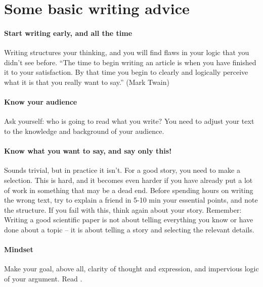 \documentclass{tufte-book}
\begin{document}
\section{Some basic writing advice}

\paragraph{Start writing early, and all the time} Writing structures your thinking, and you will find flaws in your logic that you didn't see before. ``The time to begin writing an article is when you have finished it to your satisfaction. By that time you begin to clearly and logically perceive what it is that you really want to say.'' (Mark Twain)


\paragraph{Know your audience} Ask yourself: who is going to read what you write?  You need to adjust your text to the knowledge and background of your audience. 


\paragraph{Know what you want to say, and say only this!} Sounds trivial, but in practice it isn't. For a good story, you need to make a selection. This is hard, and it becomes even harder if you have already put a lot of work in something that may be a dead end. Before spending hours on writing the wrong text, try to explain a friend in 5-10 min your essential points, and note the structure. If you fail with this, think again about your story. Remember: Writing a good scientific paper is not about telling everything you know or have done about a topic -- it is about telling a story and selecting the relevant details. 

\paragraph{Mindset} Make your goal, above all, clarity of thought and expression, and impervious logic of your argument. Read \citet{Woodford-Sounderthinkingthrough-1967}.
\end{document}
